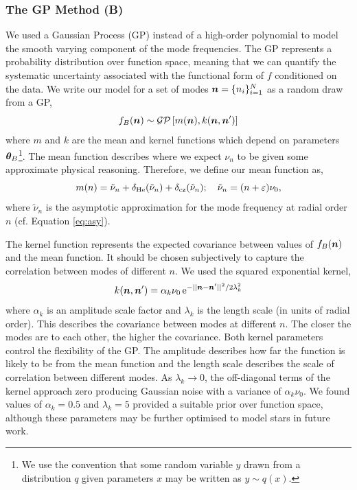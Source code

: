 \subsubsection{The GP Method (B)}

We used a Gaussian Process (GP) instead of a high-order polynomial to model the smooth varying component of the mode frequencies. The GP represents a probability distribution over function space, meaning that we can quantify the systematic uncertainty associated with the functional form of $f$ conditioned on the data. We write our model for a set of modes \(\bm{n} = \{n_i\}_{i=1}^N\) as a random draw from a GP,
%
\begin{equation}
    f_{B}(\bm{n}) \sim \mathcal{GP}\left[ m(\bm{n}), k(\bm{n}, \bm{n}') \right]
\end{equation}
%
where \(m\) and \(k\) are the mean and kernel functions which depend on parameters \(\bm{\theta}_B\)\footnote{We use the convention that some random variable \(y\) drawn from a distribution \(q\) given parameters \(x\) may be written as \(y \sim q(x)\).}. The mean function describes where we expect \(\nu_n\) to be given some approximate physical reasoning. Therefore, we define our mean function as,
%
\begin{equation}
    m(n) = \tilde{\nu}_n + \delta_{{\mathrm{He}}}(\tilde{\nu}_n) + \delta_{{\mathrm{cz}}}(\tilde{\nu}_n); \quad \tilde{\nu}_n = (n + \varepsilon) \nu_0, \label{eq:asy-glitch}
\end{equation}
%
where \(\tilde{\nu}_n\) is the asymptotic approximation for the mode frequency at radial order \(n\) (cf. Equation \ref{eq:asy}).

The kernel function represents the expected covariance between values of \(f_{B}(\bm{n})\) and the mean function. It should be chosen subjectively to capture the correlation between modes of different \(n\). We used the squared exponential kernel,
%
\begin{equation}
    k(\bm{n}, \bm{n}') = \alpha_k \nu_0 \, \mathrm{e}^{- {||\bm{n} - \bm{n}'||^2}/{2\lambda_k^2}}
\end{equation}
%
where \(\alpha_k\) is an amplitude scale factor and \(\lambda_k\) is the length scale (in units of radial order). This describes the covariance between modes at different \(n\). The closer the modes are to each other, the higher the covariance. Both kernel parameters control the flexibility of the GP. The amplitude describes how far the function is likely to be from the mean function and the length scale describes the scale of correlation between different modes. As \(\lambda_k \rightarrow 0\), the off-diagonal terms of the kernel approach zero producing Gaussian noise with a variance of \(\alpha_k\nu_0\). We found values of \(\alpha_k = 0.5\) and \(\lambda_k = 5\) provided a suitable prior over function space, although these parameters may be further optimised to model stars in future work.

